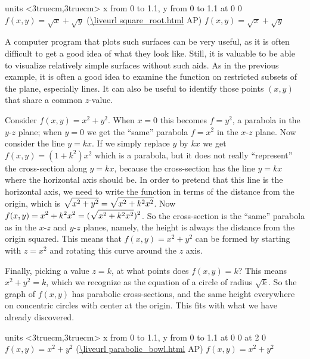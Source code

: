 \figure
\texonly
\vbox{\beginpicture
\normalgraphs
\ninepoint
\setcoordinatesystem units <3truecm,3truecm>
\setplotarea x from 0 to 1.1, y from 0 to 1.1
 at 0 0
\endpicture}
\begincaption
{$f(x,y)=\sqrt x+\sqrt y$
(\expandafter\url\expandafter{\liveurl square_root.html}%
AP\endurl)}
\endcaption
\endtexonly
{}
\htmlonly
\begincaption
$f(x,y)=\sqrt x+\sqrt y$
\endcaption
\endhtmlonly
\endfigure

A computer program that plots such surfaces can be very useful, as it
is often difficult to get a good idea of what they look like. Still,
it is valuable to be able to visualize relatively simple surfaces
without such aids. As in the previous example, it is often a good idea
to examine the function on restricted subsets of the plane, especially
lines. It can also be useful to identify those points $(x,y)$ that
share a common $z$-value.

\example Consider $f(x,y)=x^2+y^2$. When $x=0$ this becomes
$f=y^2$, a parabola in the $y$-$z$ plane; when $y=0$ we get the
``same'' parabola $f=x^2$ in the $x$-$z$ plane. 
Now consider the line $y=kx$. If we simply replace $y$ by $kx$ we get
$f(x,y)=(1+k^2)x^2$ which is a parabola, but it does not really
``represent'' the cross-section along $y=kx$, because the cross-section
has the line $y=kx$ where the horizontal axis should be.
In order to pretend that this line is the horizontal axis, we need to
write the function in terms of the distance from the origin, which is
$\displaystyle \sqrt{x^2+y^2}=\sqrt{x^2+k^2x^2}$. Now
$\displaystyle f(x,y)=x^2+k^2x^2=(\sqrt{x^2+k^2x^2})^2$. So the cross-section is the
``same'' parabola as in the $x$-$z$ and $y$-$z$ planes, namely, the
height is always the distance from the origin squared. This means that 
$f(x,y)=x^2+y^2$ can be formed by starting with $z=x^2$ and rotating
this curve around the $z$ axis.

Finally, picking a value $z=k$, at what points does
$f(x,y)=k$? This means $x^2+y^2=k$, which we recognize as the equation
of a circle of radius $\sqrt k$. So the graph of $f(x,y)$ has
parabolic cross-sections, and the same height everywhere on concentric
circles with center at the origin. This fits with what we have already
discovered. 
\endexample

\figure
\texonly
\vbox{\beginpicture
\normalgraphs
\ninepoint
\setcoordinatesystem units <3truecm,3truecm>
\setplotarea x from 0 to 1.1, y from 0 to 1.1
 at 0 0
 at 2 0
\endpicture}
\begincaption
$f(x,y)=x^2 + y^2$
(\expandafter\url\expandafter{\liveurl parabolic_bowl.html}%
AP\endurl)
\endcaption
\endtexonly
{}
\htmlonly
\begincaption
$f(x,y)=x^2 + y^2$
\endcaption
\endhtmlonly
\endfigure

